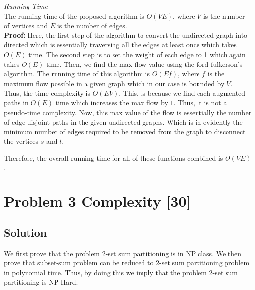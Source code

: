 \documentclass{article}
\begin{document}
\textit{Running Time}\\
The running time of the proposed algorithm is $O(VE)$, where $V$ is the number of vertices and $E$ is the number of edges.\\
\textbf{Proof:} Here, the first step of the algorithm to convert the undirected graph into directed which is essentially traversing all the edges at least once which takes $O(E)$ time. The second step is to set the weight of each edge to 1 which again takes $O(E)$ time. Then, we find the max flow value using the ford-fulkerson's algorithm. The running time of this algorithm is $O(Ef)$, where $f$ is the maximum flow possible in a given graph which in our case is bounded by  $V$. Thus, the time complexity is $O(EV)$. This, is because we find each augmented paths in $O(E)$ time which increases the max flow by $1$. Thus, it is not a pseudo-time complexity. Now, this max value of the flow is essentially the number of edge-disjoint paths in the given undirected graphs. Which is in evidently the minimum number of edges required to be removed from the graph to disconnect the vertices $s$ and $t$.

Therefore, the overall running time for all of these functions combined is $O(VE)$.\\

\section*{Problem 3 Complexity [30]}
\subsection*{Solution}
We first prove that the problem 2-set sum partitioning is in NP class. We then prove that subset-sum problem can be reduced to 2-set sum partitioning problem in polynomial time. Thus, by doing this we imply that the problem 2-set sum partitioning is NP-Hard.\\
\end{document}
